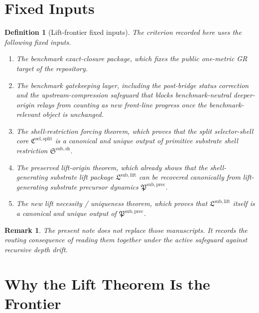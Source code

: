 \documentclass[11pt]{article}
\newcommand{\SelectorCore}{\mathfrak C^{\mathrm{sel,split}}}
\newcommand{\ShellRestriction}{\mathfrak S^{\mathrm{sub,sh}}}
\newcommand{\LiftPackage}{\mathfrak L^{\mathrm{sub,lift}}}
\newcommand{\PrecursorPackage}{\mathfrak P^{\mathrm{sub,prec}}}
\newtheorem{definition}{Definition}
\newtheorem{remark}{Remark}
\begin{document}
\section{Fixed Inputs}

\begin{definition}[Lift-frontier fixed inputs]
The criterion recorded here uses the following fixed inputs.
\begin{enumerate}
    \item The benchmark exact-closure package, which fixes the public one-metric GR target of the repository.
    \item The benchmark gatekeeping layer, including the post-bridge status correction and the upstream-compression safeguard that blocks benchmark-neutral deeper-origin relays from counting as new front-line progress once the benchmark-relevant object is unchanged.
    \item The shell-restriction forcing theorem, which proves that the split selector-shell core \(\SelectorCore\) is a canonical and unique output of primitive substrate shell restriction \(\ShellRestriction\).
    \item The preserved lift-origin theorem, which already shows that the shell-generating substrate lift package \(\LiftPackage\) can be recovered canonically from lift-generating substrate precursor dynamics \(\PrecursorPackage\).
    \item The new lift necessity / uniqueness theorem, which proves that \(\LiftPackage\) itself is a canonical and unique output of \(\PrecursorPackage\).
\end{enumerate}
\end{definition}

\begin{remark}
The present note does not replace those manuscripts. It records the routing consequence of reading them together under the active safeguard against recursive depth drift.
\end{remark}

\section{Why the Lift Theorem Is the Frontier}
\end{document}

